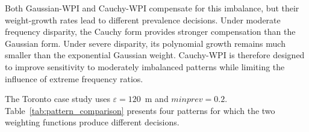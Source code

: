 \documentclass[12pt, letterpaper]{template}
\newcommand{\minprev}{\mathit{minprev}}
\theoremstyle{definition}
\begin{document}
Both Gaussian-WPI and Cauchy-WPI compensate for this imbalance, but their
weight-growth rates lead to different prevalence decisions. Under moderate
frequency disparity, the Cauchy form provides stronger compensation than the
Gaussian form. Under severe disparity, its polynomial growth remains much
smaller than the exponential Gaussian weight. Cauchy-WPI is therefore designed
to improve sensitivity to moderately imbalanced patterns while limiting the
influence of extreme frequency ratios.

The Toronto case study uses $\varepsilon=120$~m and $\minprev=0.2$.
Table~\ref{tab:pattern_comparison} presents four patterns for which the two
weighting functions produce different decisions.

\begin{table}[tbp]
\centering
\caption{Toronto patterns with different Gaussian-WPI and Cauchy-WPI
decisions ($\varepsilon=120$~m and $\minprev=0.2$).}
\label{tab:pattern_comparison}
\end{table}
\end{document}
